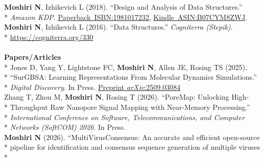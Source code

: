 \documentclass[margin,line]{res}
\begin{document}
\begin{resume}
\hspace*{4mm} \textbf{Moshiri N}, Izhikevich L (2018). ``Design and Analysis of Data Structures.''\\*\vspace{2mm}
\hspace*{8mm} \textit{Amazon KDP}. \href{https://www.amazon.com/dp/1981017232}{Paperback~ISBN:1981017232}, \href{https://www.amazon.com/dp/B07CYM8ZWJ}{Kindle~ASIN:B07CYM8ZWJ}.\\
\hspace*{4mm} \textbf{Moshiri N}, Izhikevich L (2016). ``Data Structures.'' \textit{Cogniterra (Stepik)}.\\*\vspace{2mm}
\hspace*{8mm} \href{https://cogniterra.org/330}{https://cogniterra.org/330}\\
~\\
\textbf{Papers/Articles}\vspace{2mm}\\*
\hspace*{4mm} Jones D, Yang Y, Lightstone FC, \textbf{Moshiri N}, Allen JE, Rosing TS (2025).\\*
\hspace*{9.5mm} ``SurGBSA: Learning Representations From Molecular Dynamics Simulations.''\\*\vspace{2mm}
\hspace*{8mm} \textit{Digital Discovery}. In Press. \href{https://arxiv.org/abs/2509.03084}{Preprint \textit{arXiv}:2509.03084}\\
\hspace*{4mm} Zhang T, Zhou M, \textbf{Moshiri N}, Rosing T (2026). ``PoreMap: Unlocking High-\\*
\hspace*{9.5mm} Throughput Raw Nanopore Signal Mapping with Near-Memory Processing.''\\*
\hspace*{9.5mm} \textit{International Conference on Software, Telecommunications, and Computer}\\*\vspace{2mm}
\hspace*{8mm} \textit{Networks (SoftCOM) 2026}. In Press.\\
\hspace*{4mm} \textbf{Moshiri N} (2026). ``MultiVirusConsensus: An accurate and efficient open-source\\*
\hspace*{9.5mm} pipeline for identification and consensus sequence generation of multiple viruses\\*

\end{resume}
\end{document}
